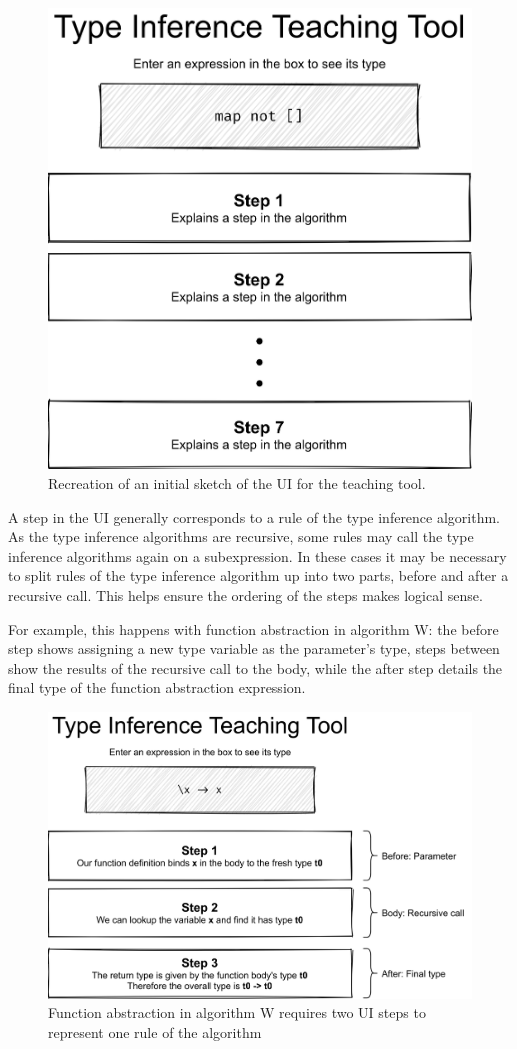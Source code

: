 \documentclass[a4paper,fleqn,oneside,12pt]{report}
\begin{document}
{\centering \begin{figure}[h!]
  \centering
  \includegraphics[width=0.756\linewidth]{images/image21.png}
  \caption{Recreation of an initial sketch of the UI for the teaching tool.}
\end{figure} \par}

A step in the UI generally corresponds to a rule of the type inference algorithm. As the type inference algorithms are recursive, some rules may call the type inference algorithms again on a subexpression. In these cases it may be necessary to split rules of the type inference algorithm up into two parts, before and after a recursive call. This helps ensure the ordering of the steps makes logical sense.

For example, this happens with function abstraction in algorithm W: the before step shows assigning a new type variable as the parameter’s type, steps between show the results of the recursive call to the body, while the after step details the final type of the function abstraction expression.

{\centering \begin{figure}[h!]
  \centering
  \includegraphics[width=0.945\linewidth]{images/image15.png}
  \caption{Function abstraction in algorithm W requires two UI steps to represent one rule of the algorithm}
\end{figure} \par}
\end{document}
